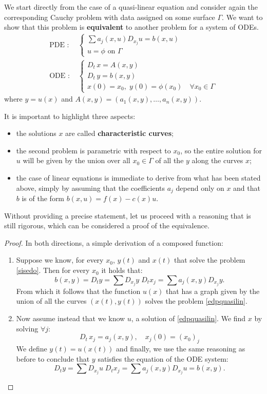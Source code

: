 We start directly from the case of a quasi-linear equation and consider again the corresponding Cauchy problem with data assigned on some surface $\Gamma$. We want to show that this problem is \textbf{equivalent} to another problem for a system of ODEs.
\begin{align} 
\label{edpquasilin}
\text{PDE : }&
\begin{cases}
\sum a_j(x,u)D_{x_j} u = b(x,u)\\
u = \phi \text{ on } \Gamma
\end{cases} \\ 
\label{sisedo}
\text{ODE : }&
\begin{cases}
D_t \, x = A(x,y) \; \\ 
D_t \, y = b(x,y)\\ 
x(0)=x_0, \; y(0) = \phi (x_0) \quad \forall x_0 \in \Gamma
\end{cases} 
\end{align}
where $y = u(x)$ and $A(x,y)=(a_1(x,y),\ldots ,a_n(x,y))$.
\begin{remark}
It is important to highlight three aspects:
\begin{itemize}
\item the solutions $x$ are called \textbf{characteristic curves};
\item the second problem is parametric with respect to $x_0$, so the entire solution for $u$ will be given by the union over all $x_0\in \Gamma$ of all the $y$ along the curves $x$;
\item the case of linear equations is immediate to derive from what has been stated above, simply by assuming that the coefficients $a_j$ depend only on $x$ and that $b$ is of the form $b(x,u)=f(x)-c(x)u$.
\end{itemize}
\end{remark}
Without providing a precise statement, let us proceed with a reasoning that is still rigorous, which can be considered a proof of the equivalence.
\begin{proof}
In both directions, a simple derivation of a composed function:
\begin{enumerate}
\item Suppose we know, for every $x_0$, $y(t)$ and $x(t)$ that solve the problem \eqref{sisedo}. Then for every $x_0$ it holds that:
$$b(x,y) = D_t y = \sum D_{x_j} y \; D_t x_j = \sum a_j(x,y) D_{x_j} y.$$
From which it follows that the function $u(x)$ that has a graph given by the union of all the curves $(x(t),y(t))$ solves the problem \eqref{edpquasilin}.
\item Now assume instead that we know $u$, a solution of \eqref{edpquasilin}. We find $x$ by solving $\forall j$:
\begin{equation*} \label{sys}
D_t \, x_j = a_j(x,y), \quad x_j(0)=(x_0)_j 
\end{equation*}
We define $y(t)=u(x(t))$ and finally, we use the same reasoning as before to conclude that $y$ satisfies the equation of the ODE system:
$$D_t y = \sum D_{x_j} u \; D_t x_j = \sum  a_j(x,y)D_{x_j} u = b(x,y).$$
\qedhere
\end{enumerate}
\end{proof}

